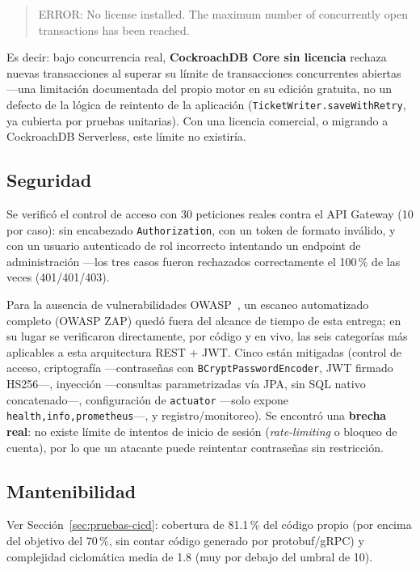 \begin{quote}
\ttfamily\small ERROR: No license installed. The maximum number of concurrently open
transactions has been reached.
\end{quote}

Es decir: bajo concurrencia real, \textbf{CockroachDB Core sin licencia} rechaza nuevas
transacciones al superar su límite de transacciones concurrentes abiertas —una limitación
documentada del propio motor en su edición gratuita, no un defecto de la lógica de reintento de
la aplicación (\texttt{TicketWriter.saveWithRetry}, ya cubierta por pruebas unitarias). Con una
licencia comercial, o migrando a CockroachDB Serverless, este límite no existiría.

\subsection{Seguridad}

Se verificó el control de acceso con 30 peticiones reales contra el API Gateway (10 por caso): sin
encabezado \texttt{Authorization}, con un token de formato inválido, y con un usuario autenticado
de rol incorrecto intentando un endpoint de administración —los tres casos fueron rechazados
correctamente el 100\,\% de las veces (401/401/403).

Para la ausencia de vulnerabilidades OWASP~\cite{owasp2021top10}, un escaneo automatizado
completo (OWASP ZAP) quedó fuera del alcance de tiempo de esta entrega; en su lugar se
verificaron directamente, por código y en vivo, las seis categorías más aplicables a esta
arquitectura REST + JWT. Cinco están mitigadas (control de acceso, criptografía —contraseñas con
\texttt{BCryptPasswordEncoder}, JWT firmado HS256—, inyección —consultas parametrizadas vía JPA,
sin SQL nativo concatenado—, configuración de \texttt{actuator} —solo expone
\texttt{health,info,prometheus}—, y registro/monitoreo). Se encontró una \textbf{brecha real}: no
existe límite de intentos de inicio de sesión (\emph{rate-limiting} o bloqueo de cuenta), por lo
que un atacante puede reintentar contraseñas sin restricción.

\subsection{Mantenibilidad}

Ver Sección~\ref{sec:pruebas-cicd}: cobertura de 81.1\,\% del código propio (por encima del
objetivo del 70\,\%, sin contar código generado por protobuf/gRPC) y complejidad ciclomática
media de 1.8 (muy por debajo del umbral de 10).

